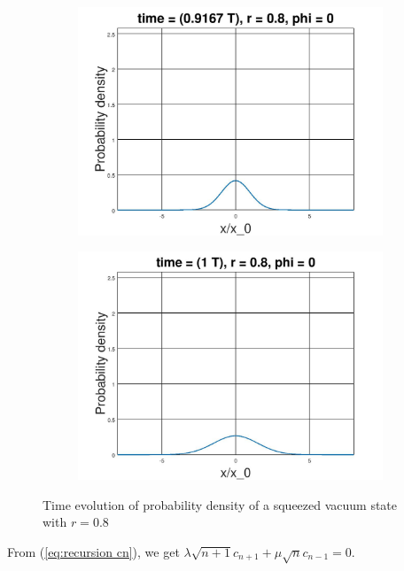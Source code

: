 \documentclass[12pt, twoside]{article}
\begin{document}
\begin{figure}[h!]
\begin{subfigure}[h!]{0.3\linewidth}
	\end{subfigure}
	\begin{subfigure}[h!]{0.3\linewidth}
		\includegraphics[width=\linewidth]{graphs/squeezed_vacuum/11.jpg}
	\end{subfigure}
	\begin{subfigure}[h!]{0.3\linewidth}
		\includegraphics[width=\linewidth]{graphs/squeezed_vacuum/12.jpg}
	\end{subfigure}
	\caption{Time evolution of probability density of a squeezed vacuum state with $r=0.8$}
\end{figure}

From (\ref{eq:recursion cn}), we get $\lambda \sqrt{n+1}c_{n+1} + \mu \sqrt{n} c_{n-1} = 0$. 
\end{document}
